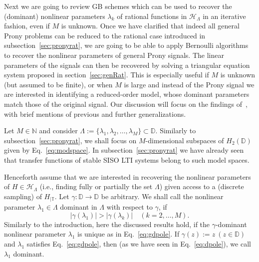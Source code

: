 \documentclass{arxiv}
\begin{document}
Next we are going to review GB schemes which can be used to recover the (dominant) nonlinear parameters $\lambda_k$ of rational functions in $\mathcal{H}_{\Lambda}$ in an iterative fashion, even if $M$ is unknown. Once we have clarified that indeed all general Prony problems can be reduced to the rational case introduced in subsection~\ref{sec:pronyrat}, we are going to be able to apply Bernoulli algorithms to recover the nonlinear parameters of general Prony signals. The linear parameters of the signals can then be recovered by solving a triangular equation system proposed in section~\ref{sec:genRat}. This is especially useful if $M$ is unknown (but assumed to be finite), or when $M$ is large and instead of the Prony signal we are interested in identifying a reduced-order model, whose dominant parameters match those of the original signal. Our discussion will focus on the findings of~\cite{siamdozsa}, with brief mentions of previous and further generalizations. 

Let $M \in \mathbb{N}$ and consider $\Lambda := \{ \lambda_1, \lambda_2, \ldots, \lambda_M\} \subset \mathbb{D}$. Similarly to subsection~\ref{sec:pronyrat}, we shall focus on $M$-dimensional subspaces of $H_2(\mathbb{D})$ given by Eq.~\eqref{eq:modspace}. In subsection~\ref{sec:pronyrat} we have already seen that transfer functions of stable SISO LTI systems belong to such model spaces. 

Henceforth assume that we are interested in recovering the nonlinear parameters of $H \in \mathcal{H}_{\Lambda}$ (i.e., finding fully or partially the set $\Lambda$) given access to a (discrete sampling) of $H_{|\mathbb{T}}$. Let $\gamma : \mathbb{D} \to \mathbb{D}$ be arbitrary. We shall call the nonlinear parameter $\lambda_1 \in \Lambda$ dominant in $\Lambda$ with respect to $\gamma$, if
\begin{equation}
    \label{eq:gdpole}
    |\gamma(\lambda_1)| > |\gamma(\lambda_k)| \quad (k=2,\ldots,M).
\end{equation}
Similarly to the introduction, here  the discussed results hold, if
the $\gamma$-dominant nonlinear parameter $\lambda_1$ is unique as in 
Eq.~\eqref{eq:gdpole}.
If $\gamma(z) := z \ (z \in \mathbb{D})$ and $\lambda_1$ satisfies Eq.~\eqref{eq:gdpole}, then (as we have seen in Eq.~\eqref{eq:dpole}), we call $\lambda_1$ dominant. 
\end{document}
